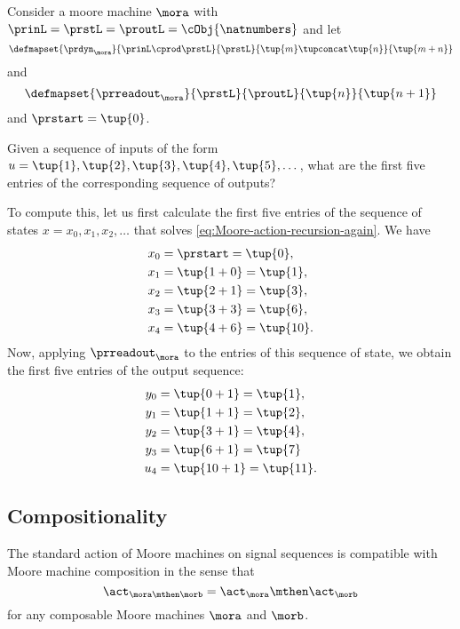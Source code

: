 \begin{example}
\label{exa:moore-standard-action}
Consider a moore machine $\mora$ with  $\prinL = \prstL = \proutL = \cObj{\natnumbers}$
and let 
\begin{equation}
\defmapset{
\prdyn_\mora
}{
\prinL \cprod \prstL
}{
\prstL
}{
\tup{m} \tupconcat \tup{n}
}{
\tup{m + n}
}
\end{equation}
and 
\begin{equation}
\defmapset{
\prreadout_\mora
}{
\prstL
}{
\proutL
}{
\tup{n}
}{
\tup{n+1}
}
\end{equation}
and $\prstart = \tup{0}$. 

Given a sequence of inputs of the form $u = \tup{1}, \tup{2}, \tup{3}, \tup{4}, \tup{5}, \dots$, what are the first five entries of the corresponding sequence of outputs? 

To compute this, let us first calculate the first five entries of the sequence of states $x = x_0, x_1, x_2, \dots$ that solves \cref{eq:Moore-action-recursion-again}. We have 
\begin{align*}
x_0 &= \prstart = \tup{0}, \\
x_1 &= \tup{1 + 0} = \tup{1}, \\
x_2 &= \tup{2 + 1} = \tup{3}, \\
x_3 &= \tup{3 + 3} = \tup{6}, \\
x_4 &= \tup{4 + 6} = \tup{10}.
\end{align*}
Now, applying $\prreadout_\mora$ to the entries of this sequence of state, we obtain the first five entries of the output sequence:
\begin{align*}
y_0 &= \tup{0 + 1} = \tup{1}, \\
y_1 &= \tup{1 + 1} = \tup{2}, \\
y_2 &= \tup{3 + 1} = \tup{4}, \\
y_3 &= \tup{6 + 1} = \tup{7} \\
u_4 &= \tup{10 + 1} = \tup{11}.
\end{align*}
\end{example}


\subsection{Compositionality}

\begin{proposition}
\label{prop:moore-action-is-a-morphism}
The standard action of Moore machines on signal sequences is compatible with Moore machine composition in the sense that
\begin{equation}
\label{eq:moore-action-compositional}
\act_{\mora \mthen \morb} = \act_\mora \mthen \act_\morb
\end{equation}
for any composable Moore machines $\mora$ and $\morb$.
\end{proposition}

